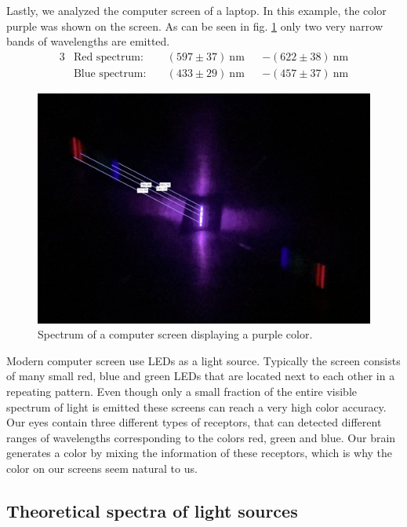 Lastly, we analyzed the computer screen of a laptop. In this example, the color purple was shown on the screen.
As can be seen in fig. \ref{fig_purple_screen} only two very narrow bands of wavelengths are emitted.
\begin{alignat}{3}
    &\text{Red spectrum:} \; &&(597 \pm 37)~\si{\nano\meter} & &- (622 \pm 38)~\si{\nano\meter} \nonumber\\
    &\text{Blue spectrum:} \; &&(433 \pm 29)~\si{\nano\meter} & &- (457 \pm 37)~\si{\nano\meter} \nonumber
\end{alignat}
\begin{figure}[H]
    \centering
    \includegraphics[scale = 0.24]{src/images/purple_screen_meas.png}
    \caption{Spectrum of a computer screen displaying a purple color.}
    \label{fig_purple_screen}
\end{figure}

Modern computer screen use LEDs as a light source. Typically the screen consists of many small red, blue and 
green LEDs that are located next to each other in a repeating pattern. Even though only a small fraction of 
the entire visible spectrum of light is emitted these screens can reach a very high color accuracy. Our eyes 
contain three different types of receptors, that can detected different ranges of wavelengths corresponding 
to the colors red, green and blue. Our brain generates a color by mixing the information of these receptors, 
which is why the color on our screens seem natural to us.

\subsection{Theoretical spectra of light sources}

